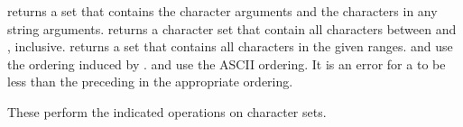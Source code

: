 \begin{protos}
\end{protos}
\noindent
{} returns a set that contains the character arguments and the
characters in any string arguments.   returns a character
set that contain all characters between  and ,
inclusive.   returns a set that contains all characters in
the given ranges.   and  use the ordering induced by
.   and  use the
 ASCII ordering.
It is an error for a  to be less than the preceding
  in the appropriate ordering.

\begin{protos}
\end{protos}
\noindent
These perform the indicated operations on character sets.

